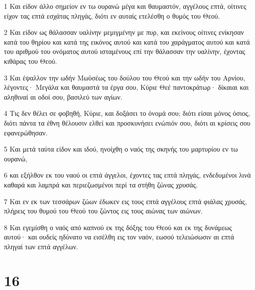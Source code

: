 \par 1 Και είδον άλλο σημείον εν τω ουρανώ μέγα και θαυμαστόν, αγγέλους επτά, οίτινες είχον τας επτά εσχάτας πληγάς, διότι εν αυταίς ετελέσθη ο θυμός του Θεού.
\par 2 Και είδον ως θάλασσαν υαλίνην μεμιγμένην με πυρ, και εκείνους οίτινες ενίκησαν κατά του θηρίου και κατά της εικόνος αυτού και κατά του χαράγματος αυτού και κατά του αριθμού του ονόματος αυτού ισταμένους επί την θάλασσαν την υαλίνην, έχοντας κιθάρας του Θεού.
\par 3 Και έψαλλον την ωδήν Μωϋσέως του δούλου του Θεού και την ωδήν του Αρνίου, λέγοντες· Μεγάλα και θαυμαστά τα έργα σου, Κύριε Θεέ παντοκράτωρ· δίκαιαι και αληθιναί αι οδοί σου, βασιλεύ των αγίων.
\par 4 Τις δεν θέλει σε φοβηθή, Κύριε, και δοξάσει το όνομά σου; διότι είσαι μόνος όσιος, διότι πάντα τα έθνη θέλουσιν ελθεί και προσκυνήσει ενώπιόν σου, διότι αι κρίσεις σου εφανερώθησαν.
\par 5 Και μετά ταύτα είδον και ιδού, ηνοίχθη ο ναός της σκηνής του μαρτυρίου εν τω ουρανώ,
\par 6 και εξήλθον εκ του ναού οι επτά άγγελοι, έχοντες τας επτά πληγάς, ενδεδυμένοι λινά καθαρά και λαμπρά και περιεζωσμένοι περί τα στήθη ζώνας χρυσάς.
\par 7 Και εν εκ των τεσσάρων ζώων έδωκεν εις τους επτά αγγέλους επτά φιάλας χρυσάς, πλήρεις του θυμού του Θεού του ζώντος εις τους αιώνας των αιώνων.
\par 8 Και εγεμίσθη ο ναός από καπνού εκ της δόξης του Θεού και εκ της δυνάμεως αυτού· και ουδείς ηδύνατο να εισέλθη εις τον ναόν, εωσού τελειώσωσιν αι επτά πληγαί των επτά αγγέλων.

\chapter{16}

